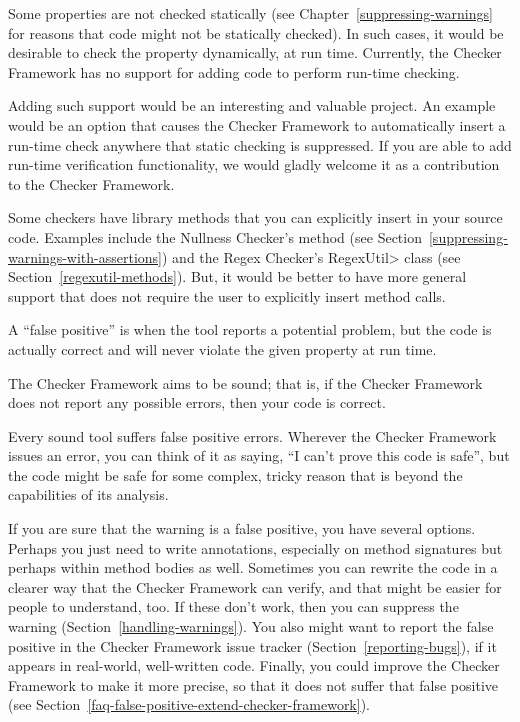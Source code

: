 
Some properties are not checked statically (see
Chapter~\ref{suppressing-warnings} for reasons that code might not be
statically checked).  In such cases, it would be desirable to check the
property dynamically, at run time.
Currently, the Checker Framework has no support for adding code to perform
run-time checking.

Adding such support would be an interesting and valuable project.
An example would be an option that causes the Checker Framework to
automatically insert a run-time check anywhere that static checking is
suppressed.
If you
are able to add run-time verification functionality, we would gladly
welcome it as a contribution to the Checker Framework.

Some checkers have library methods that you can explicitly insert in your
source code.
Examples include the Nullness Checker's
 method (see
Section~\ref{suppressing-warnings-with-assertions}) and the Regex Checker's
\<RegexUtil> class (see Section~\ref{regexutil-methods}).
But, it would be better to have more general support that does not require
the user to explicitly insert method calls.





A ``false positive'' is when the tool reports a potential problem, but the
code is actually correct and will never violate the given property at run
time.

The Checker Framework aims to be sound; that is, if the Checker Framework
does not report any possible errors, then your code is correct.

Every sound tool suffers false positive errors.
Wherever the Checker Framework issues an error, you can think of it as
saying, ``I can't prove this code is safe'', but the code might be safe for
some complex, tricky reason that is beyond the capabilities of its
analysis.

If you are sure that the warning is a false positive, you have several
options.
Perhaps you just need to write annotations, especially on method signatures
but perhaps within method bodies as well.
Sometimes you can rewrite the code in a clearer way that the Checker
Framework can verify, and that might be easier for people to understand, too.
If these don't work, then you can suppress the warning
(Section~\ref{handling-warnings}).
You also might want to report
the false positive in the Checker Framework issue tracker
(Section~\ref{reporting-bugs}), if it appears in real-world, well-written code.
%
Finally, you could improve the Checker Framework to make it more
precise, so that it does not suffer that false positive (see
Section~\ref{faq-false-positive-extend-checker-framework}).


